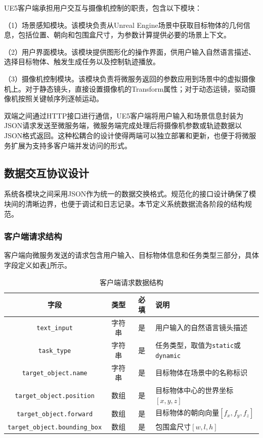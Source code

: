 UE5客户端承担用户交互与摄像机控制的职责，包含以下模块：

（1）场景感知模块。该模块负责从Unreal Engine场景中获取目标物体的几何信息，包括位置、朝向和包围盒尺寸，为参数计算提供必要的场景上下文。

（2）用户界面模块。该模块提供图形化的操作界面，供用户输入自然语言描述、选择目标物体、触发生成任务以及控制轨迹播放。

（3）摄像机控制模块。该模块负责将微服务返回的参数应用到场景中的虚拟摄像机上。对于静态镜头，直接设置摄像机的Transform属性；对于动态运镜，驱动摄像机按照关键帧序列逐帧运动。

双端之间通过HTTP接口进行通信，UE5客户端将用户输入和场景信息封装为JSON请求发送至微服务端，微服务端完成处理后将摄像机参数或轨迹数据以JSON格式返回。这种松耦合的设计使得两端可以独立部署和更新，也便于将微服务扩展为支持多客户端并发访问的形式。

\subsection{数据交互协议设计}

系统各模块之间采用JSON作为统一的数据交换格式。规范化的接口设计确保了模块间的清晰边界，也便于调试和日志记录。本节定义系统数据流各阶段的结构规范。

\subsubsection{客户端请求结构}

客户端向微服务发送的请求包含用户输入、目标物体信息和任务类型三部分，具体字段定义如表\ref{tab:client_request}所示。

\begin{table}[htbp]
\centering
\caption{客户端请求数据结构}
\label{tab:client_request}
\begin{tabular}{cccp{5.5cm}}
\toprule
字段 & 类型 & 必填 & 说明 \\
\midrule
\texttt{text\_input} & 字符串 & 是 & 用户输入的自然语言镜头描述 \\
\texttt{task\_type} & 字符串 & 是 & 任务类型，取值为\texttt{static}或\texttt{dynamic} \\
\texttt{target\_object.name} & 字符串 & 是 & 目标物体在场景中的名称标识 \\
\texttt{target\_object.position} & 数组 & 是 & 目标物体中心的世界坐标$[x, y, z]$ \\
\texttt{target\_object.forward} & 数组 & 是 & 目标物体的朝向向量$[f_x, f_y, f_z]$ \\
\texttt{target\_object.bounding\_box} & 数组 & 是 & 包围盒尺寸$[w, l, h]$ \\
\bottomrule
\end{tabular}
\end{table}


